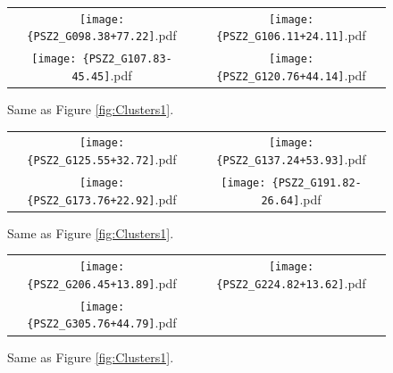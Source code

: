 \documentclass[apj, revtex4-1]{emulateapj}
\begin{document}
\begin{figure}
	\centering
	\begin{tabular}{cc}
		\texttt{[image: \{PSZ2\_G098.38+77.22]}.pdf}&
		\texttt{[image: \{PSZ2\_G106.11+24.11]}.pdf}\\
		\texttt{[image: \{PSZ2\_G107.83-45.45]}.pdf}&
		\texttt{[image: \{PSZ2\_G120.76+44.14]}.pdf}
	\end{tabular}
	\caption{Same as Figure \ref{fig:Clusters1}.}
	\label{fig:Clusters2}
\end{figure}

\begin{figure}
	\centering
	\begin{tabular}{cc}
		\texttt{[image: \{PSZ2\_G125.55+32.72]}.pdf}&
		\texttt{[image: \{PSZ2\_G137.24+53.93]}.pdf}\\
		\texttt{[image: \{PSZ2\_G173.76+22.92]}.pdf}&
		\texttt{[image: \{PSZ2\_G191.82-26.64]}.pdf}
	\end{tabular}
	\caption{Same as Figure \ref{fig:Clusters1}.}
	\label{fig:Clusters3}
\end{figure}

\begin{figure}
	\centering
	\begin{tabular}{cc}
		\texttt{[image: \{PSZ2\_G206.45+13.89]}.pdf}&
		\texttt{[image: \{PSZ2\_G224.82+13.62]}.pdf}\\
		\texttt{[image: \{PSZ2\_G305.76+44.79]}.pdf}&
	\end{tabular}
	\caption{Same as Figure \ref{fig:Clusters1}.}
	\label{fig:Clusters4}
\end{figure}
\end{document}
